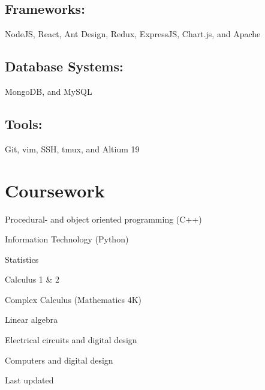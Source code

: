 \documentclass[]{resume-build}
\begin{document}
\begin{minipage}[t]{0.34\textwidth}
\subsection{Frameworks:}
NodeJS, React, Ant Design, Redux, ExpressJS, Chart.js, and Apache
\subsectionsep

\subsection{Database Systems:}
MongoDB, and MySQL
\subsectionsep

\subsection{Tools:}
Git, vim, SSH, tmux, and Altium 19
\sectionsep
%
%
\section{Coursework}
\subsectionsep
\begin{tightemize}
\item Procedural- and object oriented programming (C++)
\item Information Technology (Python)
\item Statistics
\item Calculus 1 \&  2
\item Complex Calculus (Mathematics 4K)
\item Linear algebra
\item Electrical circuits and digital design
\item Computers and digital design
\end{tightemize}
\sectionsep

Last updated 

%
%
\end{minipage} 
\hfill
\end{document}
